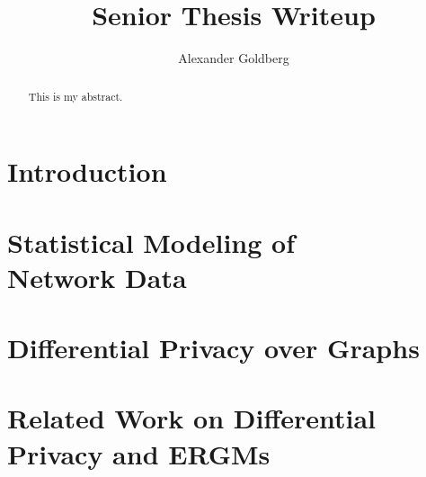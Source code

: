 \documentclass[12pt]{report}
\title{
	{Senior Thesis Writeup}\\
}
\author{Alexander Goldberg}
\date{}
\begin{document}
	
	\maketitle 
	
	\begin{abstract}
		This is my abstract.
	\end{abstract}
	
	\tableofcontents
	
	\chapter{Introduction}\label{ch:intro}
	
	
	
	\chapter[Statistical Modeling of Network Data]{Statistical Modeling of\\ Network Data}
	\label{ch:network_modeling}
	
	
	
	\chapter{Differential Privacy over Graphs}\label{ch:dp_defns}
	
	
	
	\chapter[Related Work on Differential Privacy and ERGMs]{Related Work on Differential\\ Privacy and ERGMs}\label{ch:related_work}
	
	
	
\end{document}
